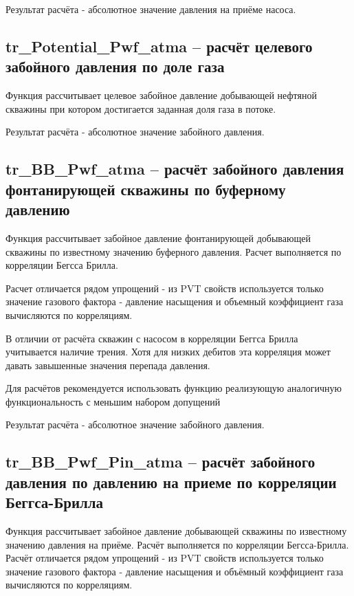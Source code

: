 \documentclass[]{scrreprt}
\begin{document}
Результат расчёта - абсолютное значение давления на приёме насоса. 



\subsection{tr\_Potential\_Pwf\_atma – расчёт целевого забойного давления по доле газа}
Функция рассчитывает целевое забойное давление добывающей нефтяной скважины при котором достигается заданная доля газа в потоке.

Результат расчёта - абсолютное значение забойного давления. 

\subsection{tr\_BB\_Pwf\_atma – расчёт забойного давления фонтанирующей скважины по буферному давлению}
Функция рассчитывает забойное давление фонтанирующей добывающей скважины по известному значению буферного давления. Расчет выполняется по корреляции Бегсса Брилла. 

Расчет отличается рядом упрощений - из PVT свойств используется только значение газового фактора - давление насыщения и объемный коэффициент газа вычисляются по корреляциям. 

В отличии от расчёта скважин с насосом в корреляции Беггса Брилла учитывается наличие трения. Хотя для низких дебитов эта корреляция может давать завышенные значения перепада давления. 

Для расчётов рекомендуется использовать функцию \unf реализующую аналогичную функциональность с меньшим набором допущений

Результат расчёта - абсолютное значение забойного давления. 

\subsection{tr\_BB\_Pwf\_Pin\_atma – расчёт забойного давления по давлению на приеме по корреляции Беггса-Брилла}
Функция рассчитывает забойное давление  добывающей скважины по известному значению давления на приёме. Расчёт выполняется по корреляции Бегсса-Брилла. 
Расчёт отличается рядом упрощений - из PVT свойств используется только значение газового фактора - давление насыщения и объёмный коэффициент газа вычисляются по корреляциям. 
\end{document}
